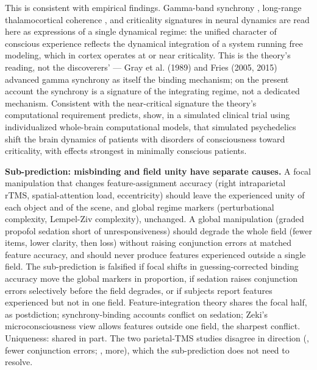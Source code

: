 \documentclass[12pt]{article}
\begin{document}
This is consistent with empirical findings. Gamma-band synchrony \citep{Gray1989,Rodriguez1999,Fries2005,Fries2015}, long-range thalamocortical coherence \citep{Llinas1993,Llinas1998,Chowdhury2026}, and criticality signatures in neural dynamics \citep{Beggs2003,Tagliazucchi2012,TuckerLuuFriston2025} are read here as expressions of a single dynamical regime: the unified character of conscious experience reflects the dynamical integration of a system running free modeling, which in cortex operates at or near criticality. This is the theory's reading, not the discoverers' — Gray et al. (1989) and Fries (2005, 2015) advanced gamma synchrony as itself the binding mechanism; on the present account the synchrony is a signature of the integrating regime, not a dedicated mechanism. Consistent with the near-critical signature the theory's computational requirement predicts, \citet{Alnagger2026} show, in a simulated clinical trial using individualized whole-brain computational models, that simulated psychedelics shift the brain dynamics of patients with disorders of consciousness toward criticality, with effects strongest in minimally conscious patients.

\textbf{Sub-prediction: misbinding and field unity have separate causes.} A focal manipulation that changes feature-assignment accuracy (right intraparietal rTMS, spatial-attention load, eccentricity) should leave the experienced unity of each object and of the scene, and global regime markers (perturbational complexity, Lempel-Ziv complexity), unchanged. A global manipulation (graded propofol sedation short of unresponsiveness) should degrade the whole field (fewer items, lower clarity, then loss) without raising conjunction errors at matched feature accuracy, and should never produce features experienced outside a single field. The sub-prediction is falsified if focal shifts in guessing-corrected binding accuracy move the global markers in proportion, if sedation raises conjunction errors selectively before the field degrades, or if subjects report features experienced but not in one field. Feature-integration theory \citep{Treisman1980} shares the focal half, as postdiction; synchrony-binding accounts conflict on sedation; Zeki's microconsciousness view allows features outside one field, the sharpest conflict. Uniqueness: shared in part. The two parietal-TMS studies disagree in direction (\citealp{Esterman2007}, fewer conjunction errors; \citealp{BraetHumphreys2009}, more), which the sub-prediction does not need to resolve.
\end{document}

